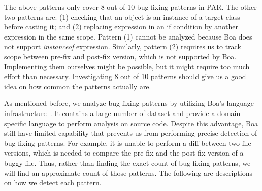 \documentclass{sig-alternate-05-2015}
\begin{document}
The above patterns only cover 8 out of 10 bug fixing patterns in PAR. The other two patterns are: (1) checking that an object is an instance of a target class before casting it; and (2) replacing expression in an if condition by another expression in the same scope. Pattern (1) cannot be analyzed because Boa does not support {\em instanceof} expression. Similarly, pattern (2) requires us to track scope between pre-fix and post-fix version, which is not supported by Boa. Implementing them ourselves might be possible, but it might require too much effort than necessary. Investigating 8 out of 10 patterns should give us a good idea on how common the patterns actually are.

As mentioned before, we analyze bug fixing patterns by utilizing Boa's language
infrastructure~\cite{dyer2013}. It contains a large number of dataset and provide
a domain specific language to perform analysis on source code. Despite this
advantage, Boa still have limited capability that prevents us from performing
precise detection of bug fixing patterns. For example, it is unable to perform a
diff between two file versions, which is needed to compare the pre-fix and the
post-fix version of a buggy file. Thus, rather than finding the exact count of
bug fixing patterns, we will find an approximate count of those patterns. The
following are descriptions on how we detect each pattern.
\end{document}
